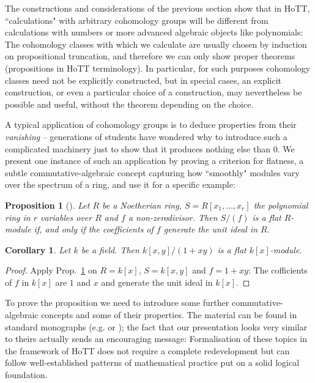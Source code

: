 \documentclass{amsart}
\theoremstyle{plain}
\numberwithin{equation}{section} %
\numberwithin{figure}{section} %
\theoremstyle{plain}
\newtheorem{cor}[thm]{Corollary} %
\theoremstyle{plain}
\theoremstyle{plain}
\theoremstyle{plain}
\theoremstyle{plain}
\newtheorem{prop}[thm]{Proposition} %
\theoremstyle{plain}
\theoremstyle{remark}
\theoremstyle{remark}
\theoremstyle{remark}
\begin{document}
The constructions and considerations of the previous section show that in HoTT, ``calculations" with arbitrary cohomology groups will be different from calculations with numbers or more advanced algebraic objects like polynomials: The cohomology classes with which we calculate are usually chosen by induction on propositional truncation, and therefore we can only show proper theorems (propositions in HoTT terminology). In particular, for such purposes cohomology classes need not be explicitly constructed, but in special cases, an explicit construction, or even a particular choice of a construction, may nevertheless be possible and useful, without the theorem depending on the choice.

A typical application of cohomology groups is to deduce properties from their \textit{vanishing} -- generations of students have wondered why to introduce such a complicated machinery just to show that it produces nothing else than $0$. We present one instance of such an application by proving a criterion for flatness, a subtle commutative-algebraic concept capturing how ``smoothly" modules vary over the spectrum of a ring, and use it for a specific example:

\begin{prop}[{\cite[Ex.6.4]{ECA}}] \label{flat-hyper-prop}
Let $R$ be a Noetherian ring, $S = R[x_1, \ldots, x_r]$ the polynomial ring in $r$ variables over $R$ and $f$ a non-zerodivisor. Then $S/(f)$ is a flat $R$-module if, and only if the coefficients of $f$ generate the unit ideal in $R$.
\end{prop}

\begin{cor}
Let $k$ be a field. Then $k[x,y]/(1+xy)$ is a flat $k[x]$-module.
\end{cor}
\begin{proof}
Apply Prop.~\ref{flat-hyper-prop} on $R = k[x]$, $S = k[x,y]$ and $f = 1 + xy$: The cofficients of $f$ in $k[x]$ are $1$ and $x$ and generate the unit ideal in $k[x]$.
\end{proof}

To prove the proposition we need to introduce some further commutative-algebraic concepts and some of their properties. The material can be found in standard monographs (e.g. \cite{Hart:AG} or \cite{ECA}); the fact that our presentation looks very similar to theirs actually sends an encouraging message: Formalisation of these topics in the framework of HoTT does not require a complete redevelopment but can follow well-established patterns of mathematical practice put on a solid logical foundation.
\end{document}
